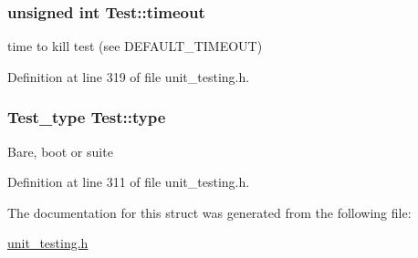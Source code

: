 \subsubsection[{\texorpdfstring{timeout}{timeout}}]{\setlength{\rightskip}{0pt plus 5cm}unsigned int Test\+::timeout}\hypertarget{structTest_a80e78f2e6aeed2a6e5b7c705ce5a1493}{}\label{structTest_a80e78f2e6aeed2a6e5b7c705ce5a1493}
time to kill test (see D\+E\+F\+A\+U\+L\+T\+\_\+\+T\+I\+M\+E\+O\+UT) 

Definition at line 319 of file unit\+\_\+testing.\+h.

\subsubsection[{\texorpdfstring{type}{type}}]{\setlength{\rightskip}{0pt plus 5cm}Test\+\_\+type Test\+::type}\hypertarget{structTest_a5074007b777ea0958966027197c17792}{}\label{structTest_a5074007b777ea0958966027197c17792}
Bare, boot or suite 

Definition at line 311 of file unit\+\_\+testing.\+h.



The documentation for this struct was generated from the following file\+:\begin{DoxyCompactItemize}
\item 
\hyperlink{unit__testing_8h}{unit\+\_\+testing.\+h}\end{DoxyCompactItemize}
